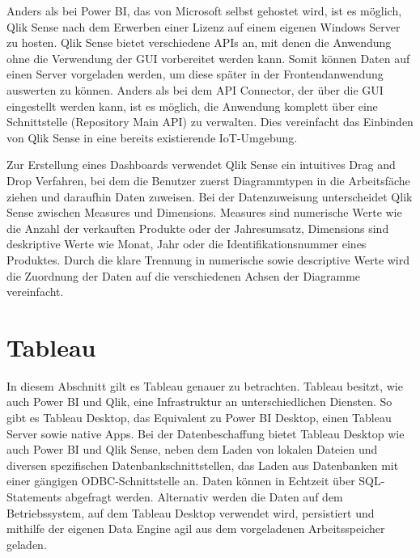 Anders als bei Power BI, das von Microsoft selbst gehostet wird, ist es möglich, Qlik Sense nach dem Erwerben
einer Lizenz auf einem eigenen Windows Server zu hosten. Qlik Sense bietet verschiedene APIs an,
mit denen die Anwendung ohne die Verwendung der GUI vorbereitet werden kann. Somit können Daten
auf einen Server vorgeladen werden, um diese später in der Frontendanwendung auswerten zu können. Anders als bei
dem API Connector, der über die GUI eingestellt werden kann, ist es möglich, die Anwendung komplett über
eine Schnittstelle (Repository Main API) zu verwalten.\cite{QlikSenseRepositoryMainAPI}
Dies vereinfacht das Einbinden von Qlik Sense in eine bereits existierende IoT-Umgebung.

Zur Erstellung eines Dashboards verwendet Qlik Sense ein intuitives Drag and Drop Verfahren,
bei dem die Benutzer zuerst Diagrammtypen in die Arbeitsfäche ziehen und
daraufhin Daten zuweisen. Bei der Datenzuweisung unterscheidet Qlik Sense zwischen Measures und
Dimensions. Measures sind numerische Werte wie die Anzahl der verkauften Produkte oder der Jahresumsatz,
Dimensions sind deskriptive Werte wie Monat, Jahr oder die Identifikationsnummer eines Produktes.\cite{TutorialsSpotMeasuresDimensions}
Durch die klare Trennung in numerische sowie descriptive Werte wird die Zuordnung der Daten
auf die verschiedenen Achsen der Diagramme vereinfacht.

\section{Tableau}
\label{sec:tableau}
In diesem Abschnitt gilt es Tableau genauer zu betrachten. Tableau besitzt, wie auch Power BI und Qlik,
eine Infrastruktur an unterschiedlichen Diensten. So gibt es Tableau Desktop, das Equivalent zu Power BI
Desktop, einen Tableau Server sowie native Apps. Bei der Datenbeschaffung bietet Tableau Desktop wie auch
Power BI und Qlik Sense, neben dem Laden von lokalen Dateien und diversen spezifischen Datenbankschnittstellen,
das Laden aus Datenbanken mit einer gängigen ODBC-Schnittstelle an. Daten können in Echtzeit
über SQL-Statements abgefragt werden. Alternativ werden die Daten auf dem Betriebssystem, auf dem
Tableau Desktop verwendet wird, persistiert und mithilfe der eigenen Data Engine agil aus dem
vorgeladenen Arbeitsspeicher geladen.\cite[S. 50]{ProTableauBook}

